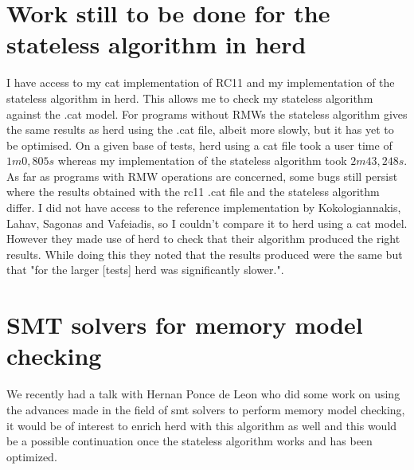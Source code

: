 \documentclass[a4,11pt]{article}
\begin{document}
\section{Work still to be done for the stateless algorithm in herd}

I have access to my cat implementation of RC11 and my implementation of the stateless algorithm in herd. This allows me to check my stateless algorithm against the .cat model. For programs without RMWs the stateless algorithm gives the same results as herd using the .cat file, albeit more slowly, but it has yet to be optimised. On a given base of tests, herd using a cat file took a user time of $1m0,805s$ whereas my implementation of the stateless algorithm took $2m43,248s$. As far as programs with RMW operations are concerned, some bugs still persist where the results obtained with the rc11 .cat file and the stateless algorithm differ. I did not have access to the reference implementation by Kokologiannakis, Lahav, Sagonas and Vafeiadis, so I couldn't compare it to herd using a cat model. However they made use of herd to check that their algorithm produced the right results. While doing this they noted that the results produced were the same but that "for the larger [tests] herd was significantly slower.".

\section{SMT solvers for memory model checking}

We recently had a talk with Hernan Ponce de Leon who did some work on using the advances made in the field of smt solvers to perform memory model checking, it would be of interest to enrich herd with this algorithm as well and this would be a possible continuation once the stateless algorithm works and has been optimized.
\end{document}
